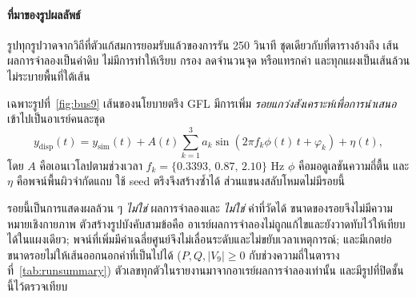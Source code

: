 \documentclass[12pt,a4paper]{article}
\begin{document}
\paragraph{ที่มาของรูปผลลัพธ์}
รูปทุกรูปวาดจากวิถีที่ตัวแก้สมการยอมรับแล้วของการรัน 250 วินาที ชุดเดียวกับที่ตารางอ้างถึง เส้นผลการจำลองเป็นค่าดิบ ไม่มีการทำให้เรียบ กรอง ลดจำนวนจุด หรือแทรกค่า และทุกแผงเป็นเส้นล้วน ไม่ระบายพื้นที่ใต้เส้น

เฉพาะรูปที่~\ref{fig:bus9} เส้นของนโยบายตรึง GFL มีการเพิ่ม \emph{รอยแกว่งสังเคราะห์เพื่อการนำเสนอ} เข้าไปเป็นอาเรย์คนละชุด
\begin{equation}
y_{\mathrm{disp}}(t)=y_{\mathrm{sim}}(t)+A(t)\sum_{k=1}^{3}a_k\sin\!\left(2\pi f_k\phi(t)\,t+\varphi_k\right)+\eta(t),
\tag{M}
\label{eq:measemul}
\end{equation}
โดย $A$ คือเอนเวโลปตามช่วงเวลา $f_k=\{0.3393,\,0.87,\,2.10\}$ Hz $\phi$ คือมอดูเลชันความถี่ตื้น และ $\eta$ คือพจน์พื้นผิวจำกัดแถบ ใช้ seed ตรึงจึงสร้างซ้ำได้ ส่วนแขนงสลับโหมดไม่มีรอยนี้

รอยนี้เป็นการแสดงผลล้วน ๆ \emph{ไม่ใช่} ผลการจำลองและ \emph{ไม่ใช่} ค่าที่วัดได้ ขนาดของรอยจึงไม่มีความหมายเชิงกายภาพ ตัวสร้างรูปบังคับสามข้อคือ อาเรย์ผลการจำลองไม่ถูกแก้ไขและยังวาดทับไว้ให้เทียบได้ในแผงเดียว; พจน์ที่เพิ่มมีค่าเฉลี่ยศูนย์จึงไม่เลื่อนระดับและไม่ขยับเวลาเหตุการณ์; และมีเกตย่อขนาดรอยไม่ให้เส้นออกนอกค่าที่เป็นไปได้ ($P,Q,\lvert V_9\rvert\ge0$ กับช่วงความถี่ในตารางที่~\ref{tab:runsummary}) ตัวเลขทุกตัวในรายงานมาจากอาเรย์ผลการจำลองเท่านั้น และมีรูปที่ปิดชั้นนี้ไว้ตรวจเทียบ
\end{document}
